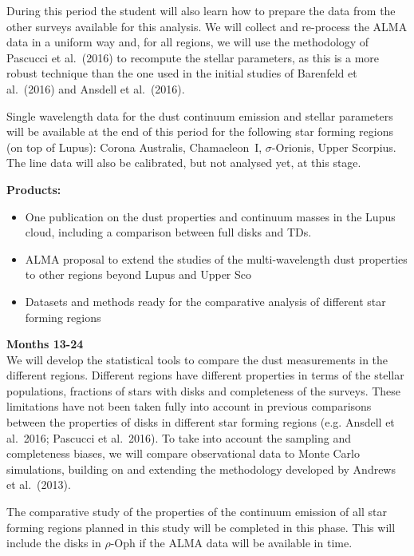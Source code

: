 \documentclass[10pt,fleqn,twoside]{article}
\begin{document}
During this period the student will also learn how to prepare the data from the other surveys available for this analysis. 
We will collect and re-process the ALMA data in a uniform way and, for all regions, we will use the methodology of Pascucci et al.~(2016) to recompute the stellar parameters, as this is a more robust 
technique than the one used in the initial studies of Barenfeld et al.~(2016) and Ansdell et al.~(2016).

Single wavelength data for the dust continuum emission and stellar parameters will be available at the end of this period for the following star forming regions (on top of Lupus): Corona Australis, Chamaeleon~I, $\sigma$-Orionis, Upper Scorpius. The line data will also be calibrated, but not analysed yet, at this stage. 

\smallskip
{\bf Products:} 
\begin{itemize}
\item One publication on the dust properties and continuum masses in the Lupus cloud, including a comparison between full disks and TDs.
\item ALMA proposal to extend the studies of the multi-wavelength dust properties to other regions beyond Lupus and Upper Sco
\item Datasets and methods ready for the comparative analysis of different star forming regions
\end{itemize}

{\bf Months 13-24}\\

We will develop the statistical tools to compare the dust measurements in the different regions.
Different regions have different properties in terms of the stellar populations, fractions of stars with disks and completeness of the surveys. These limitations have not been taken fully into account in previous 
comparisons between the properties of disks in different star forming regions (e.g. Ansdell et al.~2016; Pascucci et al.~2016). To take into account the sampling and completeness biases, we will compare observational data to Monte Carlo simulations, building on and extending the methodology developed by Andrews et al.~(2013).

The comparative study of the properties of the continuum emission of all star forming regions planned in this study will be completed in this phase. This will include the disks in $\rho$-Oph if the ALMA data will be available in time. 
\end{document}

